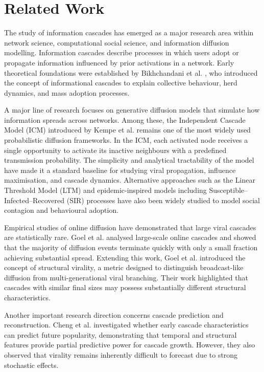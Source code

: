 \documentclass{article}
\begin{document}
\section{Related Work}

The study of information cascades has emerged as a major research area within network science, computational social science, and information diffusion modelling. Information cascades describe processes in which users adopt or propagate information influenced by prior activations in a network. Early theoretical foundations were established by Bikhchandani et al. \citep{bikhchandani1992theory}, who introduced the concept of informational cascades to explain collective behaviour, herd dynamics, and mass adoption processes.

A major line of research focuses on generative diffusion models that simulate how information spreads across networks. Among these, the Independent Cascade Model (ICM) introduced by Kempe et al. \citep{kempe2003maximizing} remains one of the most widely used probabilistic diffusion frameworks. In the ICM, each activated node receives a single opportunity to activate its inactive neighbours with a predefined transmission probability. The simplicity and analytical tractability of the model have made it a standard baseline for studying viral propagation, influence maximisation, and cascade dynamics. Alternative approaches such as the Linear Threshold Model (LTM) \citep{kempe2003maximizing} and epidemic-inspired models including Susceptible--Infected--Recovered (SIR) processes have also been widely studied to model social contagion and behavioural adoption.

Empirical studies of online diffusion have demonstrated that large viral cascades are statistically rare. Goel et al. \citep{goel2012structure} analysed large-scale online cascades and showed that the majority of diffusion events terminate quickly with only a small fraction achieving substantial spread. Extending this work, Goel et al. \citep{goel2016structural} introduced the concept of structural virality, a metric designed to distinguish broadcast-like diffusion from multi-generational viral branching. Their work highlighted that cascades with similar final sizes may possess substantially different structural characteristics.

Another important research direction concerns cascade prediction and reconstruction. Cheng et al. \citep{cheng2014can} investigated whether early cascade characteristics can predict future popularity, demonstrating that temporal and structural features provide partial predictive power for cascade growth. However, they also observed that virality remains inherently difficult to forecast due to strong stochastic effects.
\end{document}
